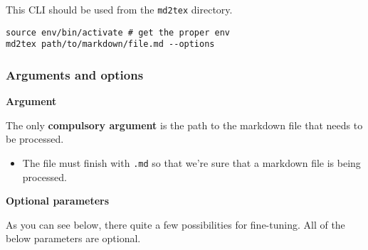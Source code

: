 \documentclass[a4paper, 12pt, twoside]{article}
\begin{document}
This CLI should be used from the \texttt{md2tex} directory.

\begin{listing}[h!]
   \begin{verbatim}
source env/bin/activate # get the proper env
md2tex path/to/markdown/file.md --options

   \end{verbatim}
\end{listing}
\subsubsection{Arguments and options}

\noindent{}\textbf{Argument}

The only \textbf{compulsory argument} is the path to the markdown file that needs to be processed.

\begin{itemize}
\item The file must finish with \texttt{.md} so that we're sure that a markdown file is being processed. 
\end{itemize}

\noindent{}\textbf{Optional parameters}

As you can see below, there quite a few possibilities for fine-tuning. All of the below
parameters are optional.
\end{document}
